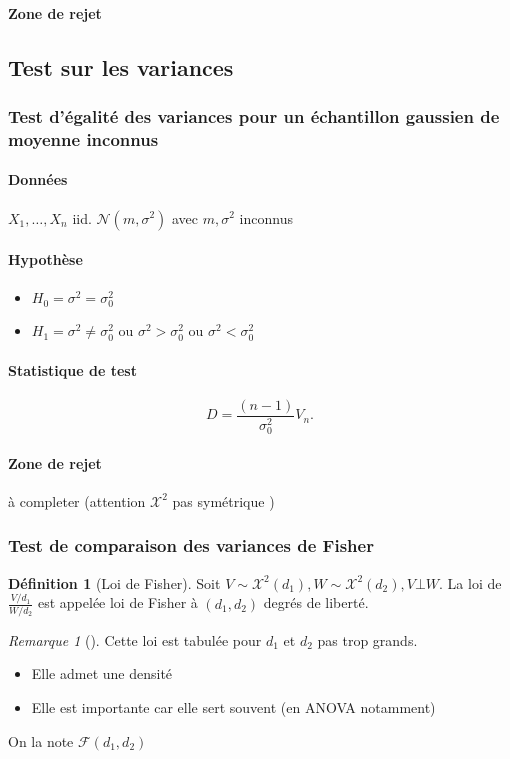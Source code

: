 \documentclass{article}
\theoremstyle{plain}%
\theoremstyle{definition}
\newtheorem{defn}{Définition}[section]
\theoremstyle{remark}
\newtheorem*{rem}{Remarque}
\begin{document}
\paragraph*{Zone de rejet}

\subsection{Test sur les variances}

\subsubsection{Test d'égalité des variances pour un échantillon gaussien de moyenne inconnus}

\paragraph*{Données} $ X_1, \dots, X_n $ iid. $ \mathcal{N}(m,\sigma ^2) $ avec $ m, \sigma ^2 $ inconnus

\paragraph*{Hypothèse}
\begin{itemize}
    \item $ H_0 = \sigma ^2 = \sigma_0 ^2 $ 
    \item $ H_1 = \sigma ^2 \neq \sigma_0 ^2 $ ou $ \sigma ^2 > \sigma_0 ^2 $ ou $ \sigma ^2 < \sigma_0 ^2 $ 
\end{itemize}

\paragraph*{Statistique de test}
\[
    D = \frac{(n-1)}{\sigma_0 ^2}V_n
.\]

\paragraph*{Zone de rejet} à completer (attention $ \mathcal{X}^2 $ pas symétrique )

\subsubsection{Test de comparaison des variances de Fisher}
\begin{defn}[Loi de Fisher]
    Soit $ V \sim \mathcal{X}^2(d_1), W \sim \mathcal{X}^2(d_2), V \bot W $. La loi de $ \frac{V/d_1}{W/d_2} $ est appelée loi de Fisher à $ (d_1, d_2) $ degrés de liberté.
    \begin{rem}[]
        Cette loi est tabulée pour $ d_1 $ et $ d_2 $ pas trop grands. \begin{itemize}
            \item Elle admet une densité
            \item Elle est importante car elle sert souvent (en ANOVA notamment)
        \end{itemize}
    \end{rem}
    On la note $ \mathcal{F}(d_1, d_2) $ 
\end{defn}
\end{document}
